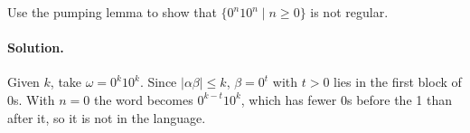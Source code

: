 \begin{exercise}
Use the pumping lemma to show that $\{0^n 1 0^n \mid n \ge 0\}$ is not regular.
\end{exercise}

\paragraph{Solution.} Given $k$, take $\omega = 0^k 1 0^k$. Since
$|\alpha\beta| \le k$, $\beta = 0^t$ with $t > 0$ lies in the first block of 0s.
With $n = 0$ the word becomes $0^{k-t} 1 0^k$, which has fewer 0s before the
1 than after it, so it is not in the language.
